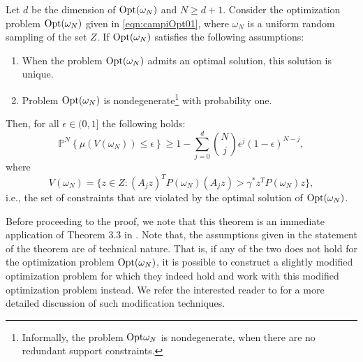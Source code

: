 \begin{theorem}\label{mainTheorem0}
Let $d$ be the dimension of $\text{Opt}(\omega_N)$ and $N \geq d+1$. Consider the optimization problem $\text{Opt}(\omega_N)$ given in \eqref{eqn:campiOpt01}, where $\omega_N$ is a uniform random sampling of the set $Z$. If $\text{Opt}(\omega_N)$ satisfies the following assumptions:
\begin{enumerate}
\item When the problem $\text{Opt}(\omega_N)$ admits an optimal solution, this solution is unique.
\item Problem $\text{Opt}(\omega_N)$ is nondegenerate\footnote{Informally, the problem $\text{Opt}{\omega_N}$ is nondegenerate, when there are no redundant support constraints.} with probability one.
\end{enumerate}
Then, for all $\epsilon \in (0,1]$ the following holds:
\begin{equation}\label{eqn:violation}\mathbb{P}^N\left\{ \mu(V(\omega_N)) \leq \epsilon \right\} \geq 1- \sum_{j=0}^{d} \binom{N}{j}\epsilon^j (1-\epsilon)^{N-j},\end{equation}
where $$V(\omega_N) = \{z \in Z: (A_j z)^TP(\omega_N)(A_j z) > \gamma^*z^TP(\omega_N)z\},$$
i.e., the set of constraints that are violated by the optimal solution of $\text{Opt}(\omega_N)$.
\end{theorem}

Before proceeding to the proof, we note that this theorem is an immediate application of Theorem 3.3 in \cite{campi}. Note that, the assumptions given in the statement of the theorem are of technical nature. That is, if any of the two does not hold for the optimization problem $\text{Opt}(\omega_N)$, it is possible to construct a slightly modified optimization problem for which they indeed hold and work with this modified optimization problem instead. We refer the interested reader to \cite{campi} for a more detailed discussion of such modification techniques.

